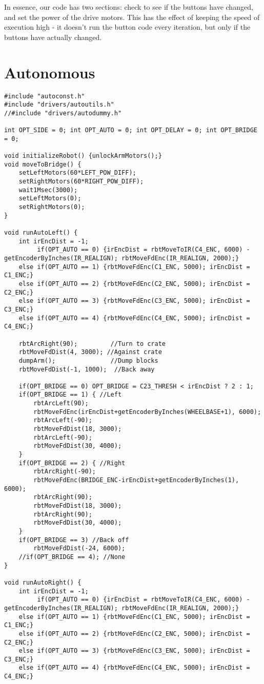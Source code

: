 In essence, our code has two sections: check to see if the buttons have changed, and set the power of the drive motors. This has the effect of keeping the speed of execution high - it doesn't run the button code every iteration, but only if the buttons have actually changed.

\section{Autonomous}
\begin{lstlisting}
#include "autoconst.h"
#include "drivers/autoutils.h"
//#include "drivers/autodummy.h"

int OPT_SIDE = 0; int OPT_AUTO = 0; int OPT_DELAY = 0; int OPT_BRIDGE = 0;

void initializeRobot() {unlockArmMotors();}
void moveToBridge() {
	setLeftMotors(60*LEFT_POW_DIFF);
	setRightMotors(60*RIGHT_POW_DIFF);
	wait1Msec(3000);
	setLeftMotors(0);
	setRightMotors(0);
}

void runAutoLeft() {
	int irEncDist = -1;
	     if(OPT_AUTO == 0) {irEncDist = rbtMoveToIR(C4_ENC, 6000) - getEncoderByInches(IR_REALIGN); rbtMoveFdEnc(IR_REALIGN, 2000);}
	else if(OPT_AUTO == 1) {rbtMoveFdEnc(C1_ENC, 5000); irEncDist = C1_ENC;}
	else if(OPT_AUTO == 2) {rbtMoveFdEnc(C2_ENC, 5000); irEncDist = C2_ENC;}
	else if(OPT_AUTO == 3) {rbtMoveFdEnc(C3_ENC, 5000); irEncDist = C3_ENC;}
	else if(OPT_AUTO == 4) {rbtMoveFdEnc(C4_ENC, 5000); irEncDist = C4_ENC;}

	rbtArcRight(90);         //Turn to crate
	rbtMoveFdDist(4, 3000); //Against crate
	dumpArm();               //Dump blocks
	rbtMoveFdDist(-1, 1000);  //Back away

	if(OPT_BRIDGE == 0) OPT_BRIDGE = C23_THRESH < irEncDist ? 2 : 1;
	if(OPT_BRIDGE == 1) { //Left
		rbtArcLeft(90);
		rbtMoveFdEnc(irEncDist+getEncoderByInches(WHEELBASE+1), 6000);
		rbtArcLeft(-90);
		rbtMoveFdDist(18, 3000);
		rbtArcLeft(-90);
		rbtMoveFdDist(30, 4000);
	}
	if(OPT_BRIDGE == 2) { //Right
		rbtArcRight(-90);
		rbtMoveFdEnc(BRIDGE_ENC-irEncDist+getEncoderByInches(1), 6000);
		rbtArcRight(90);
		rbtMoveFdDist(18, 3000);
		rbtArcRight(90);
		rbtMoveFdDist(30, 4000);
	}
	if(OPT_BRIDGE == 3) //Back off
		rbtMoveFdDist(-24, 6000);
	//if(OPT_BRIDGE == 4); //None
}

void runAutoRight() {
	int irEncDist = -1;
	     if(OPT_AUTO == 0) {irEncDist = rbtMoveToIR(C4_ENC, 6000) - getEncoderByInches(IR_REALIGN); rbtMoveFdEnc(IR_REALIGN, 2000);}
	else if(OPT_AUTO == 1) {rbtMoveFdEnc(C1_ENC, 5000); irEncDist = C1_ENC;}
	else if(OPT_AUTO == 2) {rbtMoveFdEnc(C2_ENC, 5000); irEncDist = C2_ENC;}
	else if(OPT_AUTO == 3) {rbtMoveFdEnc(C3_ENC, 5000); irEncDist = C3_ENC;}
	else if(OPT_AUTO == 4) {rbtMoveFdEnc(C4_ENC, 5000); irEncDist = C4_ENC;}


\end{lstlisting}
